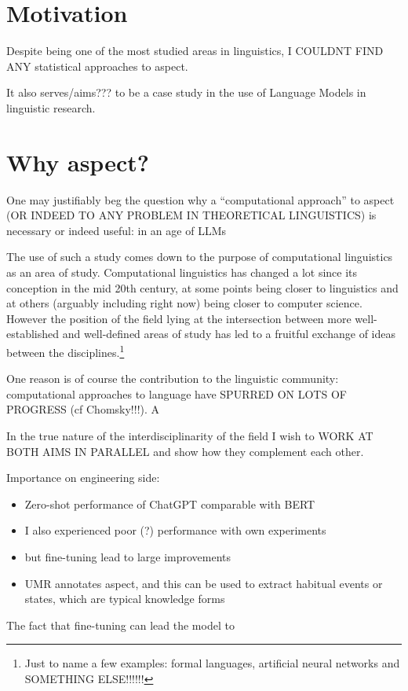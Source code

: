 \section*{Motivation}
Despite being one of the most studied areas in linguistics, I COULDNT FIND ANY statistical approaches to aspect. 

It also serves/aims??? to be a case study in the use of Language Models in linguistic research.
\section*{Why aspect?}
One may justifiably beg the question why a “computational approach” to aspect (OR INDEED TO ANY PROBLEM IN THEORETICAL LINGUISTICS) is necessary or indeed useful: in an age of LLMs

The use of such a study comes down to the purpose of computational linguistics as an area of study. Computational linguistics has changed a lot since its conception in the mid 20th century, at some points being closer to linguistics and at others (arguably including right now) being closer to computer science. However the position of the field lying at the intersection between more well-established and well-defined areas of study has led to a fruitful exchange of ideas between the disciplines.\footnote{Just to name a few examples: formal languages, artificial neural networks and SOMETHING ELSE!!!!!!}

One reason is of course the contribution to the linguistic community: computational approaches to language have SPURRED ON LOTS OF PROGRESS (cf Chomsky!!!). A 

In the true nature of the interdisciplinarity of the field I wish to WORK AT BOTH AIMS IN PARALLEL and show how they complement each other.

Importance on engineering side:
\begin{itemize}
    \item{Zero-shot performance of ChatGPT comparable with BERT \citep{zhong2023chatgpt}}
    \item{I also experienced poor (?) performance with own experiments}
    \item{but fine-tuning lead to large improvements}
    \item UMR annotates aspect, and this can be used to extract habitual events or states, which are typical knowledge forms
\end{itemize}

The fact that fine-tuning can lead the model to 

